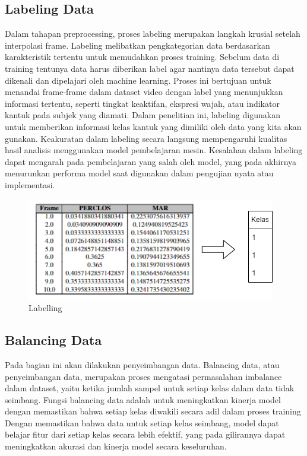 \subsection{Labeling Data}
\label{subsec:Labelling}

Dalam tahapan preprocessing, proses labeling merupakan langkah krusial setelah interpolasi frame. Labeling melibatkan pengkategorian data berdasarkan karakteristik tertentu untuk memudahkan proses training. Sebelum data di training tentunya data harus diberikan label agar nantinya data tersebut dapat dikenali dan dipelajari oleh machine learning. Proses ini bertujuan untuk menandai frame-frame dalam dataset video dengan label yang menunjukkan informasi tertentu, seperti tingkat keaktifan, ekspresi wajah, atau indikator kantuk pada subjek yang diamati. Dalam penelitian ini, labeling digunakan untuk memberikan informasi kelas kantuk yang dimiliki oleh data yang kita akan gunakan. Keakuratan dalam labeling secara langsung mempengaruhi kualitas hasil analisis menggunakan model pembelajaran mesin. Kesalahan dalam labeling dapat mengarah pada pembelajaran yang salah oleh model, yang pada akhirnya menurunkan performa model saat digunakan dalam pengujian nyata atau implementasi.

\begin{figure} [H] \centering
  \includegraphics[scale=0.75]{gambar/label.png}
  \caption{Labelling }
  \label{fig:labell}
\end{figure}


\subsection{Balancing Data}
\label{subsec:Balancing}

Pada bagian ini akan dilakukan penyeimbangan data. Balancing data, atau penyeimbangan data, merupakan proses mengatasi permasalahan imbalance dalam dataset, yaitu ketika jumlah sampel untuk setiap kelas dalam data tidak seimbang. Fungsi balancing data adalah untuk meningkatkan kinerja model dengan memastikan bahwa setiap kelas diwakili secara adil dalam proses training
Dengan memastikan bahwa data untuk setiap kelas seimbang, model dapat belajar fitur dari setiap kelas secara lebih efektif, yang pada gilirannya dapat meningkatkan akurasi dan kinerja model secara keseluruhan.

